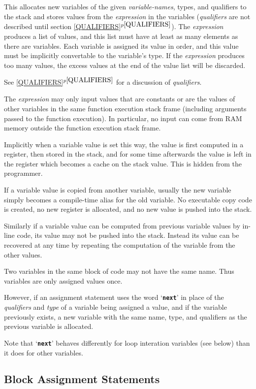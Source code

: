 \documentclass[12pt]{article}
\newcommand{\TT}[1]{{\tt \bfseries #1}}
\newcommand{\itemref}[1]{\ref{#1}$^{p\pageref{#1}}$}
\begin{document}
This allocates new variables of the given {\em variable-names}, types,
and qualifiers
to the stack and stores values from the {\em expression} in the variables
({\em qualifiers} are not described until section \itemref{QUALIFIERS}).
The {\em expression} produces a list of values, and this list must have
at least as many elements as there are variables.  Each variable is
assigned its value in order, and this value must be implicitly
convertable to the variable's type.  If the {\em expression} produces
too many values, the excess values at the end of the value list will be
discarded.

See \itemref{QUALIFIERS} for a discussion of {\em qualifiers}.

The {\em expression} may only input values that are constants or are
the values of other variables in the same function execution
stack frame (including
arguments passed to the function execution).  In particular,
no input can come from RAM memory outside the function execution stack frame.

Implicitly when a variable value is set this way, the value is first
computed in a register, then stored in the stack, and for some time
afterwards the value is left in the register which becomes a cache
on the stack value.  This is hidden from the programmer.

If a variable value is copied from another variable, usually the
new variable simply becomes a compile-time alias for the old variable.
No executable copy code is created, no new register is allocated, and no new
value is pushed into the stack.

Similarly if a variable value can be computed from previous variable
values by in-line code, 
its value may not be pushed into the stack.  Instead its
value can be recovered at any time by repeating the computation
of the variable from the other values.

Two variables in the same block of code may not have the same
name.  Thus variables are only assigned values once.

However, if an assignment statement uses the word `\TT{next}' in
place of the {\em qualifiers} and {\em type}
of a variable being assigned a value, and
if the variable previously exists, a new variable with the same
name, type, and qualifiers as the previous variable is allocated.

Note that `\TT{next}' behaves differently for loop interation
variables (see below) than it does for other variables.

\subsection{Block Assignment Statements}
\label{BlOCK-ASSIGNMENT-STATEMENTS}
\end{document}
